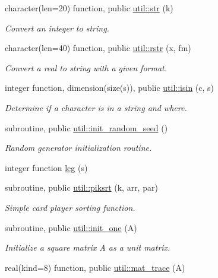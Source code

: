 \begin{DoxyCompactItemize}
\item 
character(len=20) function, public \hyperlink{namespaceutil_a1df36d0696c9183ceb6bb770f1d88111}{util\+::str} (k)
\begin{DoxyCompactList}\small\item\em Convert an integer to string. \end{DoxyCompactList}\item 
character(len=40) function, public \hyperlink{namespaceutil_ac1630658a46867b1f7255eaa51198bf3}{util\+::rstr} (x, fm)
\begin{DoxyCompactList}\small\item\em Convert a real to string with a given format. \end{DoxyCompactList}\item 
integer function, dimension(size(s)), public \hyperlink{namespaceutil_a1e2cd46baa2070e28949e28c8a3e037e}{util\+::isin} (c, s)
\begin{DoxyCompactList}\small\item\em Determine if a character is in a string and where. \end{DoxyCompactList}\item 
subroutine, public \hyperlink{namespaceutil_a3c2dcf05b068a55f0066d2b393e75dc7}{util\+::init\+\_\+random\+\_\+seed} ()
\begin{DoxyCompactList}\small\item\em Random generator initialization routine. \end{DoxyCompactList}\item 
integer function \hyperlink{util_8f90_a669ac8da4cdd11efd16a0ef72a4f7915}{lcg} (s)
\item 
subroutine, public \hyperlink{namespaceutil_af8d0a8ec8cb7391ddbf455dc92f2189d}{util\+::piksrt} (k, arr, par)
\begin{DoxyCompactList}\small\item\em Simple card player sorting function. \end{DoxyCompactList}\item 
subroutine, public \hyperlink{namespaceutil_aca7f2465fedb87fef954d8f0c30668c7}{util\+::init\+\_\+one} (A)
\begin{DoxyCompactList}\small\item\em Initialize a square matrix A as a unit matrix. \end{DoxyCompactList}\item 
real(kind=8) function, public \hyperlink{namespaceutil_a9771c95546d8658e72aa24f76612e4d8}{util\+::mat\+\_\+trace} (A)

\end{DoxyCompactItemize}
